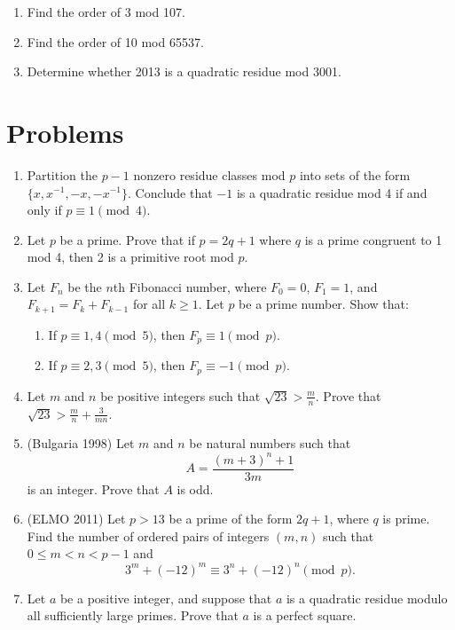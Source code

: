 \documentclass[11pt]{article}
\begin{document}
\begin{enumerate}
  \item Find the order of 3 mod 107. 
  \item Find the order of 10 mod 65537. 
  \item Determine whether 2013 is a quadratic residue mod 3001. 
\end{enumerate}

\section{Problems}

\begin{enumerate}  
  \item Partition the $p-1$ nonzero residue classes mod $p$ into sets of the form $\{x, x^{-1}, -x, -x^{-1} \}$. Conclude that $-1$ is a quadratic residue mod 4 if and only if $p \equiv 1 \pmod{4}$.  
  
  \item Let $p$ be a prime. Prove that if $p = 2q + 1$ where $q$ is a prime congruent to 1 mod 4, then 2 is a primitive root mod $p$. 

  \item Let $F_n$ be the $n$th Fibonacci number, where $F_0 = 0$, $F_1 = 1$, and $F_{k+1} = F_k + F_{k-1}$ for all $k \geq 1$. Let $p$ be a prime number. Show that: 
  \begin{enumerate}
    \item If $p \equiv 1, 4 \pmod{5}$, then $F_p \equiv 1 \pmod{p}$. 
    \item If $p \equiv 2, 3 \pmod{5}$, then $F_p \equiv -1 \pmod{p}$. 
  \end{enumerate}

  \item Let $m$ and $n$ be positive integers such that $\sqrt{23} > \frac{m}{n}$. Prove that $\sqrt{23} > \frac{m}{n} + \frac{3}{mn}$. 

  \item (Bulgaria 1998) Let $m$ and $n$ be natural numbers such that \[ A = \frac{(m+3)^n + 1}{3m} \] is an integer. Prove that $A$ is odd. 
  
  \item (ELMO 2011) Let $p>13$ be a prime of the form $2q+1$, where $q$ is prime. Find the number of ordered pairs of integers $(m,n)$ such that $0\le m<n<p-1$ and 
\[3^m+(-12)^m\equiv 3^n+(-12)^n\pmod{p}.\] 
  
  \item Let $a$ be a positive integer, and suppose that $a$ is a quadratic residue modulo all sufficiently large primes. Prove that $a$ is a perfect square. 
  

\end{enumerate}
\end{document}

